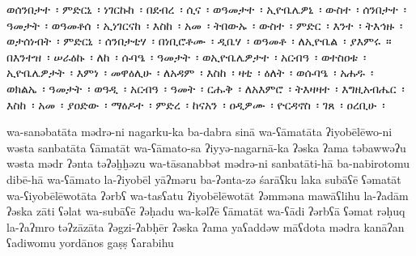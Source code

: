 
\begin{ethiopictext}
    ወሰንበታተ~፡ ምድርኒ~፡ ነገርኩከ~፡ በደብረ~፡ ሲና~፡ ወዓመታተ~፡
    ኢዮቤሌዎኒ~፡ ውስተ~፡ ሰንበታተ~፡ ዓመታት~፡ ወዓመቶሰ~፡ ኢነገርናከ~፡
    እስከ~፡ አመ~፡ ትበውኡ~፡ ውስተ~፡ ምድር~፡ እንተ~፡ ትእኅዙ~፡
    ወታሰነብት~፡ ምድርኒ~፡ ሰንበታቲሃ~፡ በነቢሮቶሙ~፡ ዲቤሃ~፡ 
    ወዓመቶ~፡ ለኢዮቤል~፡ ያእምሩ~። 
    በእንተዝ~፡ ሠራዕኩ~፡ ለከ~፡ 
    ሱባዔ~፡ ዓመታት~፡ ወኢዮቤሌዎታተ~፡ አርብዓ~፡ ወተስዐቱ~፡ ኢዮቤሌዎታት~፡
    እምነ~፡ መዋዕሊሁ~፡ ለአዳም~፡ እስከ~፡ ዛቲ~፡ ዕለት~፡ ወሱባዔ~፡
    አሐዱ~፡ ወክልኤ~፡ ዓመታት~፡ ወዓዲ~፡ አርብዓ~፡ ዓመት~፡ 
    ርሑቅ~፡ ለአእምሮ~፡ ትእዛዛተ~፡ እግዚአብሔር~፡ እስከ~፡ አመ~፡ ያዐድው~፡
    ማዕዶተ~፡ ምድረ~፡ ከናአን~፡ ዐዲዎሙ~፡ ዮርዳኖስ~፡ ገጸ~፡ ዐረቢሁ~፡
\end{ethiopictext}
\begin{transliteration}
    wa-sanəbatāta mədrə-ni nagarku-ka ba-dabra sinā wa-ʕāmatāta
    ʔiyobēlēwo-ni wəsta sanbatāta ʕāmatāt wa-ʕāmato-sa ʔiyyə-nagarnā-ka
    ʔəska ʔama təbawwəʔu wəsta mədr ʔənta təʔəḫḫəzu
    wa-tāsanabbət mədrə-ni sanbatāti-hā ba-nabirotomu dibē-hā
    wa-ʕāmato la-ʔiyobēl yāʔməru
    ba-ʔənta-zə śarāʕku laka
    subāʕē ʕəmatāt wa-ʕiyobēlēwotāta ʔərbʕ wa-tasʕatu ʔiyobēlēwotāt
    ʔəmməna mawāʕlihu la-ʔadām ʔəska zāti ʕəlat wa-subāʕē
    ʔəḥadu wa-kəlʔē ʕāmatāt wa-ʕādi ʔərbʕā ʕəmat
    rəḥuq la-ʔaʔmro təʔzāzāta ʔəgzi-ʔabḥēr ʔəska ʔama yaʕaddəw
    māʕdota mədra kanāʔan ʕadiwomu yordānos gaṣṣ ʕarabihu

\end{transliteration}

